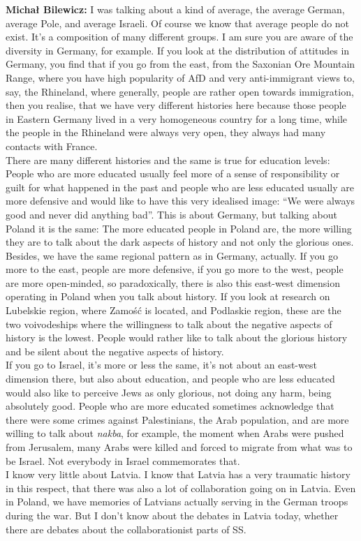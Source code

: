 \textbf{Michał Bilewicz:} I was talking about a kind of average, the average German, average Pole, and average Israeli. Of course we know that average people do not exist. It's a composition of many different groups. I am sure you are aware of the diversity in Germany, for example. If you look at the distribution of attitudes in Germany, you find that if you go from the east, from the Saxonian Ore Mountain Range, where you have high popularity of AfD and very anti-immigrant views to, say, the Rhineland, where generally, people are rather open towards immigration, then you realise, that we have very different histories here because those people in Eastern Germany lived in a very homogeneous country for a long time, while the people in the Rhineland were always very open, they always had many contacts with France.\\
There are many different histories and the same is true for education levels: People who are more educated usually feel more of a sense of responsibility or guilt for what happened in the past and people who are less educated usually are more defensive and would like to have this very idealised image: ``We were always good and never did anything bad''. This is about Germany, but talking about Poland it is the same: The more educated people in Poland are, the more willing they are to talk about the dark aspects of history and not only the glorious ones. Besides, we have the same regional pattern as in Germany, actually. If you go more to the east, people are more defensive, if you go more to the west, people are more open-minded, so paradoxically, there is also this east-west dimension operating in Poland when you talk about history. If you look at research on Lubelskie region, where Zamość is located, and Podlaskie region, these are the two voivodeships where the willingness to talk about the negative aspects of history is the lowest. People would rather like to talk about the glorious history and be silent about the negative aspects of history.\\
If you go to Israel, it's more or less the same, it's not about an east-west dimension there, but also about education, and people who are less educated would also like to perceive Jews as only glorious, not doing any harm, being absolutely good. People who are more educated sometimes acknowledge that there were some crimes against Palestinians, the Arab population, and are more willing to talk about \textit{nakba}, for example, the moment when Arabs were pushed from Jerusalem, many Arabs were killed and forced to migrate from what was to be Israel. Not everybody in Israel commemorates that.\\
I know very little about Latvia. I know that Latvia has a very traumatic history in this respect, that there was also a lot of collaboration going on in Latvia. Even in Poland, we have memories of Latvians actually serving in the German troops during the war. But I don't know about the debates in Latvia today, whether there are debates about the collaborationist parts of SS. 

